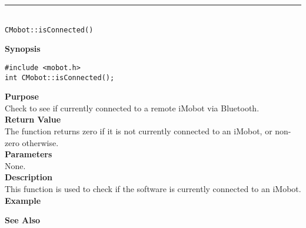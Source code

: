 \noindent
\vspace{5pt}
\rule{4.5in}{0.015in}\\
\noindent
{\LARGE \texttt{CMobot::isConnected()}}\\
{}

\noindent
{\bf Synopsis}\\
\begin{verbatim}
#include <mobot.h>
int CMobot::isConnected();
\end{verbatim}

\noindent
{\bf Purpose}\\
Check to see if currently connected to a remote iMobot via Bluetooth.\\

\noindent
{\bf Return Value}\\
The function returns zero if it is not currently connected to an iMobot, or non-zero otherwise.\\

\noindent
{\bf Parameters}\\
None.\\

\noindent
{\bf Description}\\
This function is used to check if the software is currently connected to
an iMobot.\\

\noindent
{\bf Example}\\
\noindent

\noindent
{\bf See Also}\\

